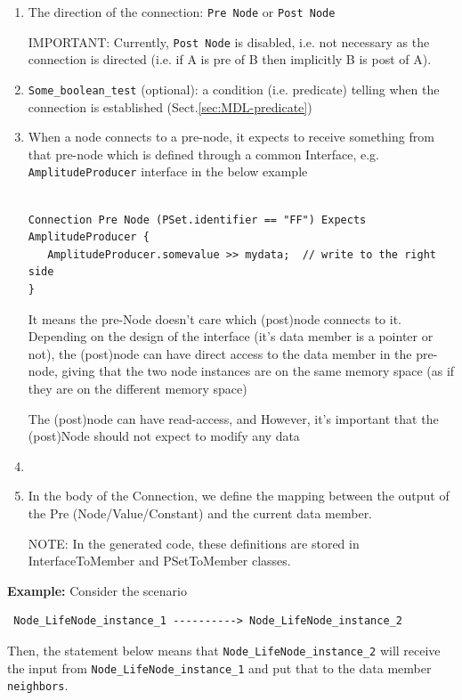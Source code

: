 \begin{enumerate}
  \item The direction of the connection: \verb!Pre Node! or \verb!Post Node!
  
 IMPORTANT: Currently, \verb!Post Node! is disabled, i.e. not necessary as the
 connection is directed (i.e. if A is pre of B then implicitly B is post of A).
 
  \item \verb!Some_boolean_test! (optional): a condition (i.e. predicate)
  telling when the connection is established (Sect.\ref{sec:MDL-predicate})


  \item When a node connects to a pre-node, it expects to receive something
  from that pre-node which is defined through a common Interface, e.g. 
  \verb!AmplitudeProducer! interface in the below example
  
\begin{verbatim}

Connection Pre Node (PSet.identifier == "FF") Expects AmplitudeProducer {
   AmplitudeProducer.somevalue >> mydata;  // write to the right side
}
\end{verbatim}

It means the pre-Node doesn't care which (post)node connects to it. 
Depending on the design of the interface (it's data member is a pointer or not),
the (post)node can have direct access to the data member in the pre-node, giving
that the two node instances are on the same memory space (as if they are on the
different memory space)

The (post)node can have read-access, and 
However, it's
important that the (post)Node should not expect to modify any data

  \item 
  
  \item In the body of the Connection, we define the mapping between the output
of the Pre (Node/Value/Constant) and the current data member.

NOTE: In the generated code, these definitions are stored in InterfaceToMember
and PSetToMember classes.


\end{enumerate}

{\bf Example:} Consider the scenario
 \begin{verbatim}
 Node_LifeNode_instance_1 ----------> Node_LifeNode_instance_2
 \end{verbatim}
 Then, the statement below means that \verb!Node_LifeNode_instance_2! will
 receive the input from \verb!Node_LifeNode_instance_1! and put that to the data
 member \verb!neighbors!.

